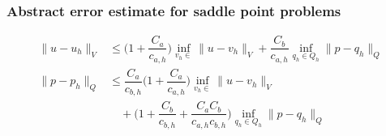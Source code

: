 \begin{frame}
  \frametitle{Abstract error estimate for saddle point problems}

  \begin{align*}
    \| u - u_h \|_V 
    &\leqslant
    \bigl(
    1 + \dfrac{C_a}{c_{a,h}}
    \big)
  \inf_{v_h \in } \| u - v_h \|_V
  +
  \dfrac{C_b}{c_{a,h}}
  \inf_{q_h \in Q_h} \| p - q_h \|_Q 
  \\
  \| p - p_h \|_Q
  &\leqslant 
  \dfrac{C_a}{c_{b,h}}
  \bigl(
  1 + \dfrac{C_a}{c_{a,h}}
  \bigr)
  \inf_{v_h \in} \| u - v_h \|_V
  \\
  &\quad +
  \bigl(
  1 + \dfrac{C_b}{c_{b,h}} 
  + \dfrac{C_a C_b}{c_{a,h}c_{b,h}}
  \bigr)
  \inf_{q_h \in Q_h} \| p - q_h \|_Q
  \end{align*}

\end{frame}

